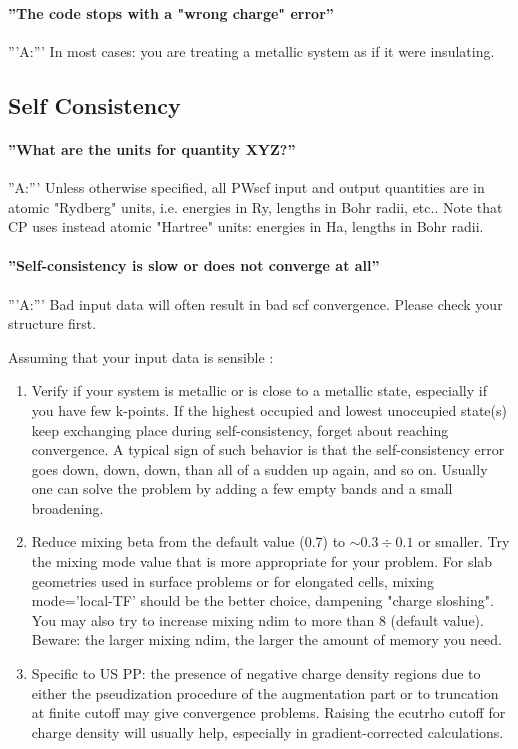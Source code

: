 \documentclass[12pt,a4paper]{article}
\begin{document}
\paragraph{ ''The code stops with a "wrong charge" error''}
'''A:''' In most cases: you are treating a metallic system
as if it were insulating.

\subsection{Self Consistency}

\paragraph{''What are the units for quantity XYZ?''}
''A:''' Unless otherwise specified, all PWscf input and output
quantities are in atomic "Rydberg" units, i.e. energies in Ry, lengths
in Bohr radii, etc.. Note that CP uses instead atomic "Hartree" units:
energies in Ha, lengths in Bohr radii. 

\paragraph{''Self-consistency is slow or does not converge at all''}
'''A:''' Bad input data will often result in bad scf
convergence. Please check your structure first.
 
Assuming that your input data is sensible :
\begin{enumerate}
\item Verify if your system is metallic or is close to a metallic
  state, especially if you have few k-points. If the highest occupied
  and lowest unoccupied state(s) keep exchanging place during
  self-consistency, forget about reaching convergence. A typical sign
  of such behavior is that the self-consistency error goes down, down,
  down, than all of a sudden up again, and so on. Usually one can
  solve the problem by adding a few empty bands and a small
  broadening. 
\item Reduce mixing beta from the default value (0.7) to $\sim 0.3\div
  0.1$ or smaller. Try the mixing mode value that is more
  appropriate for your problem. For slab geometries used in surface
  problems or for elongated cells, mixing
  mode='local-TF' should be the better choice,
  dampening "charge sloshing". You may also try to increase mixing
  ndim to more than 8 (default value). Beware: the larger mixing ndim,
  the larger the amount of memory you need. 
\item Specific to US PP: the presence of negative charge density
  regions due to either the pseudization procedure of the augmentation
  part or to truncation at finite cutoff may give convergence
  problems. Raising the ecutrho cutoff for charge density will usually
  help, especially in gradient-corrected calculations. 
\end{enumerate}
\end{document}
